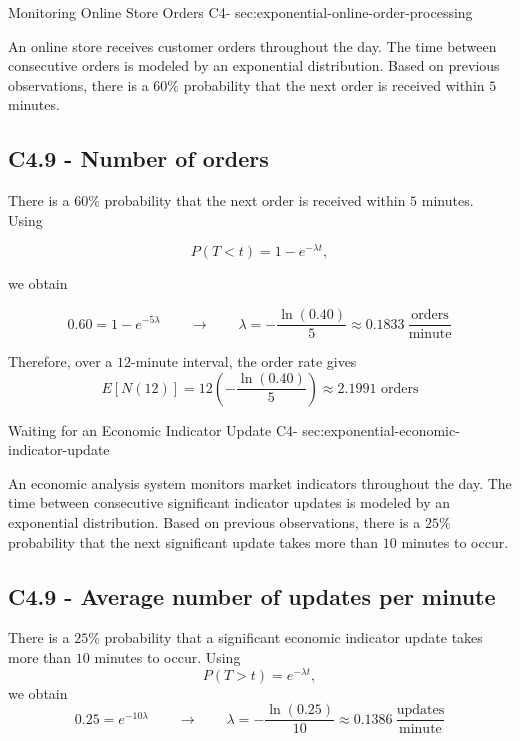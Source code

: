 	
	\sectionScored
	{Monitoring Online Store Orders}
	{C4-}
	{sec:exponential-online-order-processing}
	{
		An online store receives customer orders throughout the day. The time
		between consecutive orders is modeled by an exponential distribution.
		Based on previous observations, there is a \(60\%\) probability that the
		next order is received within \(5\) minutes.
		
		
		\label{subsec:c4-find-rate-orders}
		\subsection*{C4.9 - Number of orders}
		
		There is a \(60\%\) probability that the next order is received within
		\(5\) minutes. Using
		
		$$
		P(T<t)=1-e^{-\lambda t},
		$$
		
		we obtain
		
		$$
		0.60=1-e^{-5\lambda}
		\qquad \longrightarrow \qquad
		\lambda=-\frac{\ln(0.40)}{5}
		\approx0.1833\>\frac{\text{orders}}{\text{minute}}
		$$
		
		Therefore, over a \(12\)-minute interval, the order rate gives
		$$
		E[N(12)]=12\left(-\frac{\ln(0.40)}5\right)
		\approx \boxed{2.1991\text{ orders}}
		$$
		
		\vspace{-5mm}
	}
	
	\sectionScored
	{Waiting for an Economic Indicator Update}
	{C4-}
	{sec:exponential-economic-indicator-update}
	{
		An economic analysis system monitors market indicators throughout the
		day. The time between consecutive significant indicator updates is
		modeled by an exponential distribution. Based on previous observations,
		there is a \(25\%\) probability that the next significant update takes
		more than \(10\) minutes to occur.
		
		
		\label{subsec:c4-find-rate-economic-update}
		\subsection*{C4.9 - Average number of updates per minute}
		
		There is a \(25\%\) probability that a significant economic indicator
		update takes more than \(10\) minutes to occur. Using
		\[
		P(T>t)=e^{-\lambda t},
		\]
		we obtain
		\[
		0.25=e^{-10\lambda}
		\qquad \longrightarrow \qquad
		\lambda=-\frac{\ln(0.25)}{10}
		\approx \boxed{0.1386\>\frac{\text{updates}}{\text{minute}}}
		\]
		\vspace{-5mm}
	}
	
